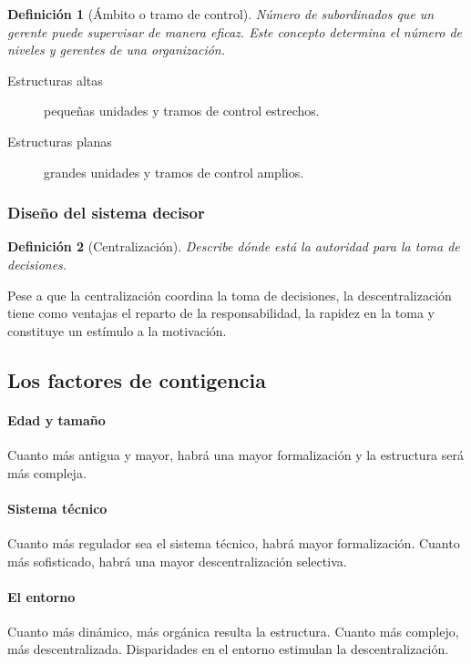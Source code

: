 \documentclass[12pt]{article}
\theoremstyle{definition_wo_parentheses}
\newtheorem{definicion}{Definición}[section]
\begin{document}
\begin{definicion}[Ámbito o tramo de control] Número de subordinados que un gerente puede supervisar de manera eficaz. Este concepto determina el número de niveles y gerentes de una organización.
\end{definicion}

\begin{description}
\item [Estructuras altas] pequeñas unidades y tramos de control estrechos.
\item [Estructuras planas] grandes unidades y tramos de control amplios.
\end{description}


\subsubsection{Diseño del sistema decisor}

\begin{definicion}[Centralización]

	Describe dónde está la autoridad para la toma de decisiones.

\end{definicion}

	Pese a que la centralización coordina la toma de decisiones, la descentralización tiene como ventajas el reparto de la responsabilidad, la rapidez en la toma y constituye un estímulo a la motivación.

\subsection{Los factores de contigencia}

\paragraph{Edad y tamaño} Cuanto más antigua y mayor, habrá una mayor formalización y la estructura será más compleja.

\paragraph{Sistema técnico} Cuanto más regulador sea el sistema técnico, habrá mayor formalización. Cuanto más sofisticado, habrá una mayor descentralización selectiva.

\paragraph{El entorno} Cuanto más dinámico, más orgánica resulta la estructura. Cuanto más complejo, más descentralizada. Disparidades en el entorno estimulan la descentralización.
\end{document}
